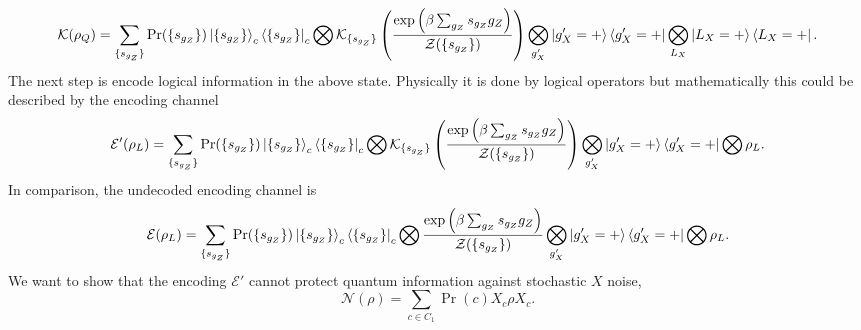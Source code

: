\documentclass[twoside,english,aps,showpacs,pra,superscriptaddress]{revtex4-2}
\begin{document}
\begin{equation}
    \mathcal{K}(\rho_Q) = \sum_{\{s_{g_Z}\} } \Pr(\{s_{g_Z}\} ) \ket{\{s_{g_Z}\}}_c\bra{\{s_{g_Z}\}}_c \bigotimes \mathcal{K}_{\{s_{g_Z}\}} \left(\frac{\exp\left(\beta \sum_{g_Z} s_{g_Z} g_Z\right) }{\mathcal{Z}(\{s_{g_Z}\})} \right)\bigotimes_{g_X'} \ket{g_X'=+} \bra{g_X'=+} \bigotimes_{L_X} \ket{L_X=+}\bra{L_X=+}.
\end{equation}
The next step is encode logical information in the above state. Physically it is done by logical operators but mathematically this could be described by the encoding channel
\begin{equation}
    \mathcal{E}'(\rho_L) = \sum_{\{s_{g_Z}\} } \Pr(\{s_{g_Z}\} ) \ket{\{s_{g_Z}\}}_c\bra{\{s_{g_Z}\}}_c \bigotimes \mathcal{K}_{\{s_{g_Z}\}} \left(\frac{\exp\left(\beta \sum_{g_Z} s_{g_Z} g_Z\right) }{\mathcal{Z}(\{s_{g_Z}\})} \right)\bigotimes_{g_X'} \ket{g_X'=+} \bra{g_X'=+} \bigotimes \rho_L.
\end{equation}
In comparison, the undecoded encoding channel is
\begin{equation}
    \mathcal{E}(\rho_L) = \sum_{\{s_{g_Z}\} } \Pr(\{s_{g_Z}\} ) \ket{\{s_{g_Z}\}}_c\bra{\{s_{g_Z}\}}_c \bigotimes  \frac{\exp\left(\beta \sum_{g_Z} s_{g_Z} g_Z\right) }{\mathcal{Z}(\{s_{g_Z}\})} \bigotimes_{g_X'} \ket{g_X'=+} \bra{g_X'=+} \bigotimes \rho_L.
\end{equation}
We want to show that the encoding $\mathcal{E}'$ cannot protect quantum information against stochastic $X$ noise,
\begin{equation}
    \mathcal{N} (\rho) = \sum_{c \in C_1} \Pr(c) X_c \rho X_c.
\end{equation}
\end{document}
